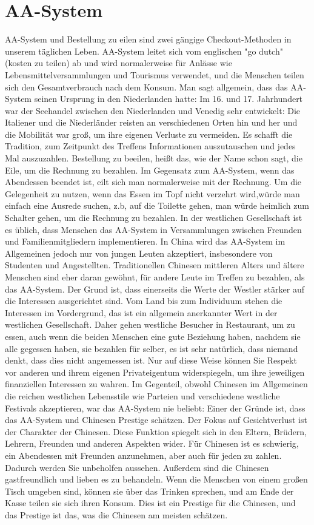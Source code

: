 \section{AA-System}
AA-System und Bestellung zu eilen sind zwei gängige Checkout-Methoden in unserem täglichen Leben.
AA-System leitet sich vom englischen "go dutch" (kosten zu teilen) ab und wird normalerweise für Anlässe wie Lebensmittelversammlungen und Tourismus verwendet, und die Menschen teilen sich den Gesamtverbrauch nach dem Konsum. Man sagt allgemein, dass das AA-System seinen Ursprung in den Niederlanden hatte: Im 16. und 17. Jahrhundert war der Seehandel zwischen den Niederlanden und Venedig sehr entwickelt: Die Italiener und die Niederländer reisten an verschiedenen Orten hin und her und die Mobilität war gro\ss , um ihre eigenen Verluste zu vermeiden. Es schafft die Tradition, zum Zeitpunkt des Treffens Informationen auszutauschen und jedes Mal auszuzahlen. 
\mypar
Bestellung zu beeilen, hei\ss t das, wie der Name schon sagt, die Eile, um die Rechnung zu bezahlen. Im Gegensatz zum AA-System, wenn das Abendessen beendet ist, eilt sich man normalerweise mit der Rechnung. Um die Gelegenheit zu nutzen, wenn das Essen im Topf nicht verzehrt wird,würde  man einfach eine Ausrede suchen, z.b, auf die Toilette gehen, man würde heimlich zum Schalter gehen, um die Rechnung zu bezahlen.
\mypar
In der westlichen Gesellschaft ist es üblich, dass Menschen das AA-System in Versammlungen zwischen Freunden und Familienmitgliedern implementieren. In China wird das AA-System im Allgemeinen jedoch nur von jungen Leuten akzeptiert, insbesondere von Studenten und Angestellten. Traditionellen Chinesen mittleren Alters und ältere Menschen sind eher daran gewöhnt, für andere Leute im Treffen zu bezahlen, als das AA-System.
\mypar
Der Grund ist, dass einerseits die Werte der Westler stärker auf die Interessen ausgerichtet sind. Vom Land bis zum Individuum stehen die Interessen im Vordergrund, das ist ein allgemein anerkannter Wert in der westlichen Gesellschaft. Daher gehen westliche Besucher in Restaurant, um zu essen, auch wenn die beiden Menschen eine gute Beziehung haben, nachdem sie alle gegessen haben, sie bezahlen für selber, es ist sehr natürlich, dass niemand denkt, dass dies nicht angemessen ist. Nur auf diese Weise können Sie Respekt vor anderen und ihrem eigenen Privateigentum widerspiegeln, um ihre jeweiligen finanziellen Interessen zu wahren. Im Gegenteil, obwohl Chinesen im Allgemeinen die reichen westlichen Lebensstile wie Parteien und verschiedene westliche Festivals akzeptieren, war das AA-System nie beliebt: Einer der Gründe ist, dass das AA-System und Chinesen Prestige schätzen. Der Fokus auf Gesichtverlust ist der Charakter der Chinesen. Diese Funktion spiegelt sich in den Eltern, Brüdern, Lehrern, Freunden und anderen Aspekten wider. Für Chinesen ist es schwierig, ein Abendessen mit Freunden anzunehmen, aber auch für jeden zu zahlen. Dadurch werden Sie unbeholfen aussehen. Au\ss erdem sind die Chinesen gastfreundlich und lieben es zu behandeln. Wenn die Menschen von einem gro\ss en Tisch umgeben sind, können sie über das Trinken sprechen, und am Ende der Kasse teilen sie sich ihren Konsum. Dies ist ein Prestige für die Chinesen, und das Prestige ist das, was die Chinesen am meisten schätzen. 

